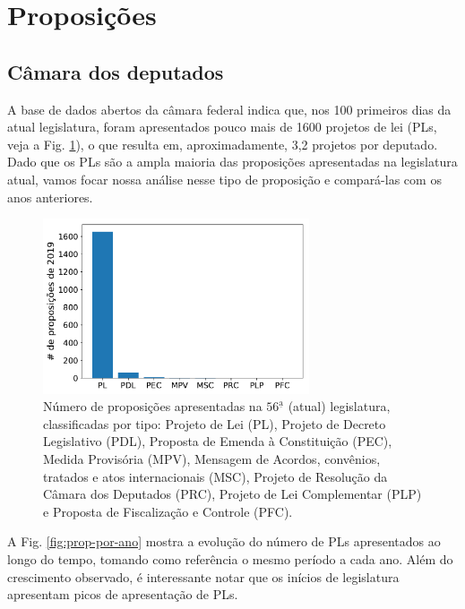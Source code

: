\documentclass[12pt,a4paper]{article}
\begin{document}
\section{Proposições}
\label{sec:proposicoes}

\subsection{Câmara dos deputados}
\label{sec:temas-camara}

A base de dados abertos da câmara federal indica que, nos 100 primeiros dias da atual legislatura,
foram apresentados pouco mais de 1600 projetos de lei (PLs, veja a Fig. \ref{fig:prop-2019-tipo}),
o que resulta em, aproximadamente, 3,2 projetos por deputado. Dado que os PLs são a ampla maioria
das proposições apresentadas na legislatura atual, vamos focar nossa análise nesse tipo de proposição e
compará-las com os anos anteriores.

\begin{figure}[H]
\centering
\includegraphics[width=0.7\textwidth]{graficos/proposicoes-2019-por-tipo_2019-05-01.pdf}
\caption{Número de proposições apresentadas na $56^{\mathrm{\underline{a}}}$ (atual) legislatura,
  classificadas por tipo: Projeto de Lei (PL), Projeto de Decreto Legislativo (PDL),
  Proposta de Emenda à Constituição (PEC), Medida Provisória (MPV), Mensagem de Acordos,
  convênios, tratados e atos internacionais (MSC), Projeto de Resolução da Câmara dos Deputados (PRC),
  Projeto de Lei Complementar (PLP) e Proposta de Fiscalização e Controle (PFC).}
\label{fig:prop-2019-tipo}
\end{figure} 

A Fig. \ref{fig:prop-por-ano} mostra a evolução do número de PLs apresentados ao longo do tempo,
tomando como referência o mesmo período a cada ano. Além do crescimento observado, é interessante
notar que os inícios de legislatura apresentam picos de apresentação de PLs.
\end{document}
